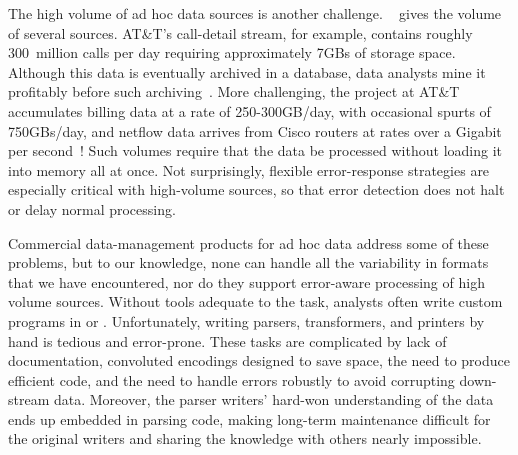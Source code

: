 The high volume of ad hoc data sources is another challenge.
~ gives the volume of several sources.
AT\&T's call-detail stream, for example, contains roughly 300~million
calls per day requiring approximately 7GBs of storage space.  Although
this data is eventually archived in a database, data analysts mine it
profitably before such archiving~\cite{kdd98,kdd99}.  More
challenging, the \ningaui{} project at AT\&T accumulates billing data
at a rate of 250-300GB/day, with occasional spurts of 750GBs/day, and
netflow data arrives from Cisco routers at rates over a Gigabit per
second~\cite{gigascope}!  Such volumes require that the data be
processed without loading it into memory all at once.  Not
surprisingly, flexible error-response strategies are especially
critical with high-volume sources, so that error detection does not
halt or delay normal processing.


Commercial data-management products for ad hoc data address 
some of these problems, but to our knowledge, none can handle all the variability
in formats that we have encountered, nor do they support error-aware
processing of high volume sources.  Without tools adequate to the
task, analysts often write custom programs in \C{} or \perl{}.
Unfortunately, writing parsers, transformers, and printers by hand is
tedious and error-prone.  These tasks are complicated by lack of
documentation, convoluted encodings designed to save space, the need
to produce efficient code, and the need to handle errors robustly to
avoid corrupting down-stream data.  Moreover, the parser writers'
hard-won understanding of the data ends up embedded in parsing code,
making long-term maintenance difficult for the original writers and
sharing the knowledge with others nearly impossible.

\subsection{\padsmlbig{}}

